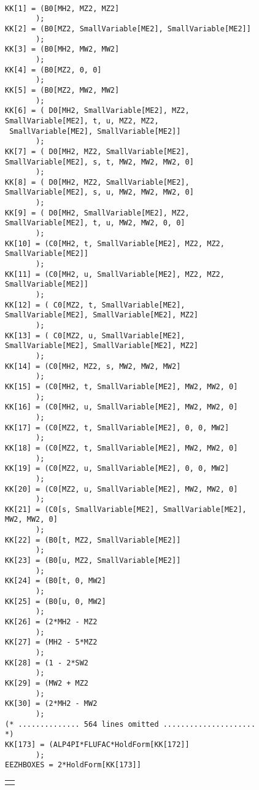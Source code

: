 \begin{figure}[H]
\begin{scriptsize}
\begin{verbatim}

KK[1] = (B0[MH2, MZ2, MZ2]
       );
KK[2] = (B0[MZ2, SmallVariable[ME2], SmallVariable[ME2]]
       );
KK[3] = (B0[MH2, MW2, MW2]
       );
KK[4] = (B0[MZ2, 0, 0]
       );
KK[5] = (B0[MZ2, MW2, MW2]
       );
KK[6] = ( D0[MH2, SmallVariable[ME2], MZ2, SmallVariable[ME2], t, u, MZ2, MZ2, 
 SmallVariable[ME2], SmallVariable[ME2]]
       );
KK[7] = ( D0[MH2, MZ2, SmallVariable[ME2], SmallVariable[ME2], s, t, MW2, MW2, MW2, 0]
       );
KK[8] = ( D0[MH2, MZ2, SmallVariable[ME2], SmallVariable[ME2], s, u, MW2, MW2, MW2, 0]
       );
KK[9] = ( D0[MH2, SmallVariable[ME2], MZ2, SmallVariable[ME2], t, u, MW2, MW2, 0, 0]
       );
KK[10] = (C0[MH2, t, SmallVariable[ME2], MZ2, MZ2, SmallVariable[ME2]]
       );
KK[11] = (C0[MH2, u, SmallVariable[ME2], MZ2, MZ2, SmallVariable[ME2]]
       );
KK[12] = ( C0[MZ2, t, SmallVariable[ME2], SmallVariable[ME2], SmallVariable[ME2], MZ2]
       );
KK[13] = ( C0[MZ2, u, SmallVariable[ME2], SmallVariable[ME2], SmallVariable[ME2], MZ2]
       );
KK[14] = (C0[MH2, MZ2, s, MW2, MW2, MW2]
       );
KK[15] = (C0[MH2, t, SmallVariable[ME2], MW2, MW2, 0]
       );
KK[16] = (C0[MH2, u, SmallVariable[ME2], MW2, MW2, 0]
       );
KK[17] = (C0[MZ2, t, SmallVariable[ME2], 0, 0, MW2]
       );
KK[18] = (C0[MZ2, t, SmallVariable[ME2], MW2, MW2, 0]
       );
KK[19] = (C0[MZ2, u, SmallVariable[ME2], 0, 0, MW2]
       );
KK[20] = (C0[MZ2, u, SmallVariable[ME2], MW2, MW2, 0]
       );
KK[21] = (C0[s, SmallVariable[ME2], SmallVariable[ME2], MW2, MW2, 0]
       );
KK[22] = (B0[t, MZ2, SmallVariable[ME2]]
       );
KK[23] = (B0[u, MZ2, SmallVariable[ME2]]
       );
KK[24] = (B0[t, 0, MW2]
       );
KK[25] = (B0[u, 0, MW2]
       );
KK[26] = (2*MH2 - MZ2
       );
KK[27] = (MH2 - 5*MZ2
       );
KK[28] = (1 - 2*SW2
       );
KK[29] = (MW2 + MZ2
       );
KK[30] = (2*MH2 - MW2
       );
(* .............. 564 lines omitted ..................... *)
KK[173] = (ALP4PI*FLUFAC*HoldForm[KK[172]]
       );
EEZHBOXES = 2*HoldForm[KK[173]]

\end{verbatim}
\end{scriptsize}
\begin{tabular*}{0.8\textwidth}{c}\hhline\end{tabular*}
\end{figure}

